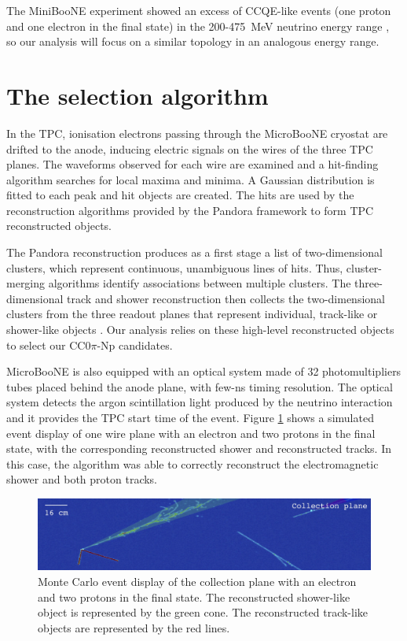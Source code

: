 \documentclass[a4paper]{article}
\begin{document}

The MiniBooNE experiment showed an excess of CCQE-like events (one proton and one electron in the final state) in the 200-475~MeV neutrino energy range \cite{miniboone}, so our analysis will focus on a similar topology in an analogous energy range.

\section{The selection algorithm}
In the TPC, ionisation electrons passing through the MicroBooNE cryostat are drifted to the anode, inducing electric signals on the wires of the three TPC planes. The waveforms observed for each wire are examined and a hit-finding algorithm searches for local maxima and minima. A Gaussian distribution is fitted to each peak and hit objects are created. The hits are used by the reconstruction algorithms provided by the Pandora framework \cite{pandora} to form TPC reconstructed objects. 

The Pandora reconstruction produces as a first stage a list of two-dimensional clusters, which represent continuous, unambiguous lines of hits. Thus, cluster-merging algorithms identify associations between multiple clusters. The three-dimensional track and shower reconstruction then collects the two-dimensional clusters from the three readout planes that represent individual, track-like or shower-like objects \cite{pandora2}. Our analysis relies on these high-level reconstructed objects to select our CC0$\pi$-Np candidates.

MicroBooNE is also equipped with an optical system made of 32 photomultipliers tubes placed behind the anode plane, with few-ns timing resolution. The optical system detects the argon scintillation light produced by the neutrino interaction and it provides the TPC start time of the event.
Figure \ref{fig:evd} shows a simulated event display of one wire plane with an electron and two protons in the final state, with the corresponding reconstructed shower and reconstructed tracks. In this case, the algorithm was able to correctly reconstruct the electromagnetic shower and both proton tracks.

\begin{figure}[htbp]
	\begin{center}
    	\includegraphics[width=0.8\linewidth]{figures/evd.jpg}
    	\caption{Monte Carlo event display of the collection plane with an electron and two protons in the final state. The reconstructed shower-like object is represented by the green cone. The reconstructed track-like objects are represented by the red lines.} \label{fig:evd}
	\end{center}
\end{figure}
\end{document}
